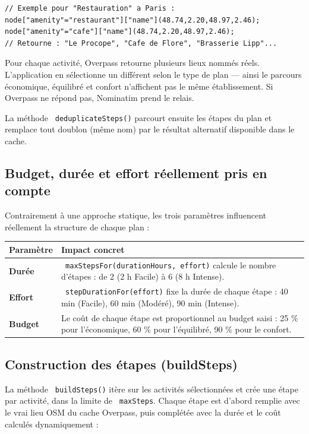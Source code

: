 \documentclass[a4paper,12pt,openany]{report}
\newcommand{\ic}[1]{\texttt{\small\colorbox{lightbg}{\color{navy!90} #1}}}
\begin{document}
\begin{lstlisting}
// Exemple pour "Restauration" a Paris :
node["amenity"="restaurant"]["name"](48.74,2.20,48.97,2.46);
node["amenity"="cafe"]["name"](48.74,2.20,48.97,2.46);
// Retourne : "Le Procope", "Cafe de Flore", "Brasserie Lipp"...
\end{lstlisting}

Pour chaque activité, Overpass retourne plusieurs lieux nommés réels.
L'application en sélectionne un différent selon le type de plan —
ainsi le parcours économique, équilibré et confort n'affichent pas
le même établissement. Si Overpass ne répond pas, Nominatim prend le relais.

La méthode \ic{deduplicateSteps()} parcourt ensuite les étapes du plan et remplace
tout doublon (même nom) par le résultat alternatif disponible dans le cache.

\subsection{Budget, durée et effort réellement pris en compte}

Contrairement à une approche statique, les trois paramètres influencent
réellement la structure de chaque plan :

\begin{tabularx}{\textwidth}{>{\bfseries}l X}
  \toprule
  Paramètre & Impact concret \\
  \midrule
  Durée
    & \ic{maxStepsFor(durationHours, effort)} calcule le nombre d'étapes :
      de 2 (2 h Facile) à 6 (8 h Intense). \\
  Effort
    & \ic{stepDurationFor(effort)} fixe la durée de chaque étape :
      40 min (Facile), 60 min (Modéré), 90 min (Intense). \\
  Budget
    & Le coût de chaque étape est proportionnel au budget saisi :
      25 \% pour l'économique, 60 \% pour l'équilibré, 90 \% pour le confort. \\
  \bottomrule
\end{tabularx}

\subsection{Construction des étapes (buildSteps)}

La méthode \ic{buildSteps()} itère sur les activités sélectionnées et crée
une étape par activité, dans la limite de \ic{maxSteps}. Chaque étape est
d'abord remplie avec le vrai lieu OSM du cache Overpass, puis complétée
avec la durée et le coût calculés dynamiquement :
\end{document}
